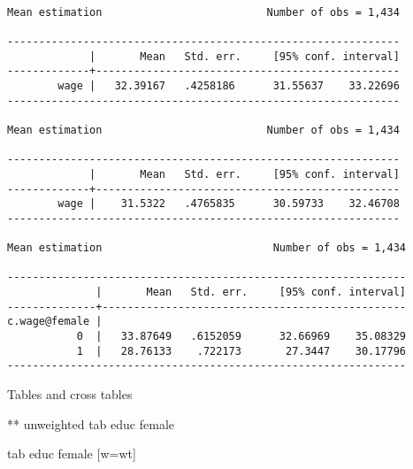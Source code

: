 \documentclass[
  letterpaper,
  DIV=11,
  numbers=noendperiod]{scrartcl}
\newenvironment{Shaded}{\begin{snugshade}}{\end{snugshade}}
\newcommand{\FunctionTok}[1]{\textcolor[rgb]{0.28,0.35,0.67}{#1}}
\newcommand{\KeywordTok}[1]{\textcolor[rgb]{0.00,0.23,0.31}{#1}}
\newcommand{\NormalTok}[1]{\textcolor[rgb]{0.00,0.23,0.31}{#1}}
\begin{document}
\begin{verbatim}

Mean estimation                          Number of obs = 1,434

--------------------------------------------------------------
             |       Mean   Std. err.     [95% conf. interval]
-------------+------------------------------------------------
        wage |   32.39167   .4258186      31.55637    33.22696
--------------------------------------------------------------

Mean estimation                          Number of obs = 1,434

--------------------------------------------------------------
             |       Mean   Std. err.     [95% conf. interval]
-------------+------------------------------------------------
        wage |    31.5322   .4765835      30.59733    32.46708
--------------------------------------------------------------

Mean estimation                           Number of obs = 1,434

---------------------------------------------------------------
              |       Mean   Std. err.     [95% conf. interval]
--------------+------------------------------------------------
c.wage@female |
           0  |   33.87649   .6152059      32.66969    35.08329
           1  |   28.76133    .722173       27.3447    30.17796
---------------------------------------------------------------
\end{verbatim}

Tables and cross tables

\begin{Shaded}
\begin{Highlighting}[]
\NormalTok{** unweighted}
\KeywordTok{tab}\NormalTok{ educ female}

\KeywordTok{tab}\NormalTok{ educ female [}\FunctionTok{w}\NormalTok{=wt]}
\end{Highlighting}
\end{Shaded}
\end{document}
